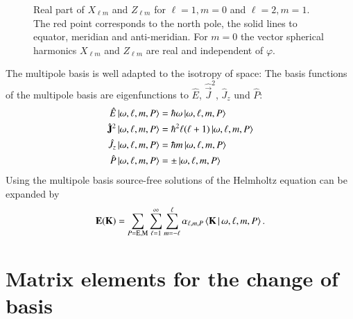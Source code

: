 \begin{figure}
\caption{Real part of $X_{\ell m}$ and $Z_{\ell m}$ for $\ell=1, m=0$ and
$\ell=2, m=1$. The red point corresponds to the north pole, the solid lines to
equator, meridian and anti-meridian. For $m=0$ the vector spherical harmonics
$X_{\ell m}$ and $Z_{\ell m}$ are real and independent of $\varphi$.}
\label{fig:basis_xlmzlm}
\end{figure}

The multipole basis is well adapted to the isotropy of space:
The basis functions of the multipole basis are eigenfunctions to $\hat E$,
$\hat{\vec{J}}^2$, $\hat{J}_z$ und $\hat P$:
\begin{align}
\hat{E} \ket{\omega,\ell,m,P} &= \hbar\omega \ket{\omega,\ell,m,P} \\
\hat{{\mathbf{J}}}^2 \ket{\omega,\ell,m,P} &= \hbar^2 \ell(\ell+1) \ket{\omega,\ell,m,P} \\
\hat{J}_z \ket{\omega,\ell,m,P} &= \hbar m \ket{\omega,\ell,m,P} \\
\hat{P} \ket{\omega,\ell,m,P} &= \pm \ket{\omega,\ell,m,P}
\end{align}
Using the multipole basis source-free solutions of the Helmholtz equation can be expanded by
\begin{equation}
{\mathbf{E}}({\mathbf{K}}) = \sum_{P=\text{E},\text{M}} \sum_{\ell=1}^\infty \sum_{m=-\ell}^\ell \alpha_{\ell,m,P} \braket{{\mathbf{K}} \, | \, \omega, \ell, m, P}.
\end{equation}


\section{Matrix elements for the change of basis}


